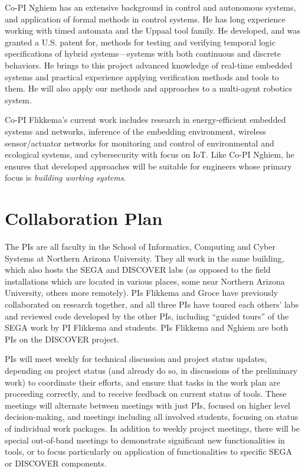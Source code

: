\documentclass[12pt]{article}
\begin{document}
Co-PI Nghiem has an extensive background in control and autonomous systems, and application of formal methods in control systems.
He has long experience working with timed automata and the Uppaal tool family.
He developed, and was granted a U.S. patent for, methods for testing and verifying temporal logic specifications of hybrid systems---systems with both continuous and discrete behaviors.
He brings to this project advanced knowledge of real-time embedded systems and practical experience applying verification methods and tools to them.
He will also
apply our methods and approaches to a multi-agent robotics system.

Co-PI Flikkema's current work includes research in energy-efficient embedded systems and networks, inference of the embedding environment, wireless sensor/actuator networks for monitoring and control of environmental and ecological systems, and cybersecurity with focus on IoT.  Like Co-PI Nghiem, he ensures that developed approaches will be suitable for engineers whose primary focus is \emph{building working systems}.

\section{Collaboration Plan}

The PIs are all faculty in the School of Informatics, Computing and Cyber Systems at Northern Arizona University.  They all work in the same building, which also hosts the SEGA and DISCOVER labs (as opposed to the field installations which are located in various places, some near Northern Arizona University, others more remotely).  PIs Flikkema and Groce have previously collaborated on research together, and all three PIs have toured each others' labs and reviewed code developed by the other PIs, including ``guided tours'' of the SEGA work by PI Flikkema and students.  PIs Flikkema and Nghiem are both PIs on the DISCOVER project.

PIs will meet weekly for technical discussion and project status updates, depending on project status (and already do so, in discussions of the preliminary work) to coordinate their efforts, and ensure that tasks in the work plan are proceeding correctly, and to receive feedback on current status of tools.  These meetings will alternate between meetings with just PIs, focused on higher level decision-making, and meetings including all involved students, focusing on status of individual work packages.
In addition to weekly project meetings, there will be special out-of-band meetings to demonstrate significant new functionalities in tools, or to focus particularly on application of functionalities to specific SEGA or DISCOVER components.
\end{document}
